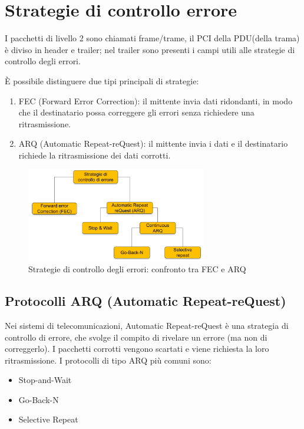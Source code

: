 
\section{Strategie di controllo errore}
I pacchetti di livello 2 sono chiamati frame/trame, il PCI della PDU(della trama) è diviso in header e trailer; nel trailer sono presenti i campi utili alle strategie di controllo degli errori.

È possibile distinguere due tipi principali di strategie:
\begin{enumerate}
    \item FEC (Forward Error Correction): il mittente invia dati ridondanti, in modo che il destinatario possa correggere gli errori senza richiedere una ritrasmissione.
    \item ARQ (Automatic Repeat-reQuest): il mittente invia i dati e il destinatario richiede la ritrasmissione dei dati corrotti. 
\end{enumerate}

\begin{figure}[htbp]
    \centering
    \includegraphics[width=0.7\textwidth]{images/strategierrore.png}
    \caption{Strategie di controllo degli errori: confronto tra FEC e ARQ}
\end{figure}

\subsection{Protocolli ARQ (Automatic Repeat-reQuest)}
Nei sistemi di telecomunicazioni, Automatic Repeat-reQuest è una strategia di controllo di errore, che svolge il compito di rivelare un errore (ma non di correggerlo). I pacchetti corrotti vengono scartati e viene richiesta la loro ritrasmissione.
I protocolli di tipo ARQ più comuni sono:

\begin{multicols}{3}
\begin{itemize}
    \item Stop-and-Wait 
    \item Go-Back-N 
    \item Selective Repeat
\end{itemize}
\end{multicols}


